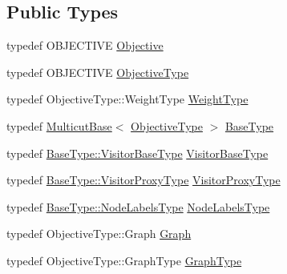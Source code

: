 \subsection*{Public Types}
\begin{DoxyCompactItemize}
\item 
typedef O\+B\+J\+E\+C\+T\+I\+V\+E \hyperlink{classnifty_1_1graph_1_1optimization_1_1multicut_1_1Cgc_ac3e728f92d355814ff3b40b5f7d59123}{Objective}
\item 
typedef O\+B\+J\+E\+C\+T\+I\+V\+E \hyperlink{classnifty_1_1graph_1_1optimization_1_1multicut_1_1Cgc_a10339a861b453cdeb2e85e8371bd013d}{Objective\+Type}
\item 
typedef Objective\+Type\+::\+Weight\+Type \hyperlink{classnifty_1_1graph_1_1optimization_1_1multicut_1_1Cgc_ac8f7c1da4b33561e45fe423f2c12b2b5}{Weight\+Type}
\item 
typedef \hyperlink{classnifty_1_1graph_1_1optimization_1_1multicut_1_1MulticutBase}{Multicut\+Base}$<$ \hyperlink{classnifty_1_1graph_1_1optimization_1_1multicut_1_1Cgc_a10339a861b453cdeb2e85e8371bd013d}{Objective\+Type} $>$ \hyperlink{classnifty_1_1graph_1_1optimization_1_1multicut_1_1Cgc_aa973cf9cceaa9e15ea351036f3c81fdf}{Base\+Type}
\item 
typedef \hyperlink{classnifty_1_1graph_1_1optimization_1_1common_1_1SolverBase_a5a14d64c70a9cc0eebc7d71d2b089f9b}{Base\+Type\+::\+Visitor\+Base\+Type} \hyperlink{classnifty_1_1graph_1_1optimization_1_1multicut_1_1Cgc_adb95cdb68d34774e9a3cb4990ab54ccb}{Visitor\+Base\+Type}
\item 
typedef \hyperlink{classnifty_1_1graph_1_1optimization_1_1common_1_1SolverBase_a58913ea9ab9232ff72608b710c1012d0}{Base\+Type\+::\+Visitor\+Proxy\+Type} \hyperlink{classnifty_1_1graph_1_1optimization_1_1multicut_1_1Cgc_a0c82617574e6f1c5b2e801ed5699d725}{Visitor\+Proxy\+Type}
\item 
typedef \hyperlink{classnifty_1_1graph_1_1optimization_1_1common_1_1SolverBase_a6e4e465f3b6e039882669fcfb9714818}{Base\+Type\+::\+Node\+Labels\+Type} \hyperlink{classnifty_1_1graph_1_1optimization_1_1multicut_1_1Cgc_a2976a0116b64803813b4b0c1555a2e70}{Node\+Labels\+Type}
\item 
typedef Objective\+Type\+::\+Graph \hyperlink{classnifty_1_1graph_1_1optimization_1_1multicut_1_1Cgc_a4737d533c9d4d62c220bb81f5acba0fe}{Graph}
\item 
typedef Objective\+Type\+::\+Graph\+Type \hyperlink{classnifty_1_1graph_1_1optimization_1_1multicut_1_1Cgc_a7954c621d6b0085dac0a0208e8edeb98}{Graph\+Type}
\item 

\end{DoxyCompactItemize}
